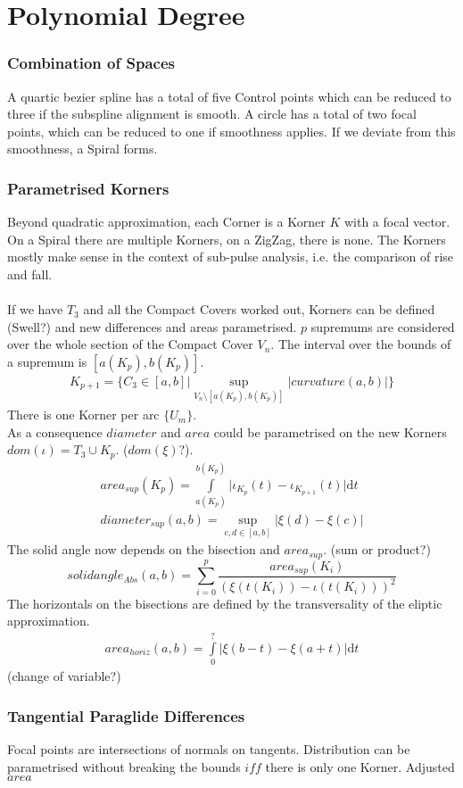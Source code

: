 \documentclass[a4paper,landscape]{report}
\begin{document}
\chapter{Polynomial Degree}
\subsection{Combination of Spaces}
A quartic bezier spline has a total of five Control points which can be reduced to three if the subspline alignment is smooth. A circle has a total of two focal points, which can be reduced to one if smoothness applies. If we deviate from this smoothness, a Spiral forms.
\subsection{Parametrised Korners}
Beyond quadratic approximation, each Corner is a Korner $K$ with a focal vector. On a Spiral there are multiple Korners, on a ZigZag, there is none. The Korners mostly make sense in the context of sub-pulse analysis, i.e. the comparison of rise and fall.\\\\
If we have $T_{3}$ and all the Compact Covers worked out, Korners can be defined (Swell?) and new differences and areas parametrised. $p$ supremums are considered over the whole section of the Compact Cover $V_{n}$. The interval over the bounds of a supremum is $[a(K_{p}),b(K_{p})]$.
\begin{align}
K_{p+1} = \{ C_{3} \in  [a,b]\vert \sup \limits _{V_{n} \setminus [a(K_{p}),b(K_{p})]} \lvert curvature(a,b) \rvert \}
\end{align}
There is one Korner per arc $\{U_{m}\}$.\\
As a consequence $diameter$ and $area$ could be parametrised on the new Korners $dom(\iota)=T_{3}\cup K_{p}$. ($dom(\xi)$?).\\
\begin{align}
area_{sup}(K_{p})=\int \limits _{a(K_{p})}^{b(K_{p})} \lvert \iota_{K_{p}}(t)-\iota_{K_{p+1}}(t) \rvert \mathrm{d}t\\
diameter_{sup}(a,b)=\sup \limits _{c,d \in [a,b]} \lvert \xi(d) - \xi(c) \rvert
\end{align}
The solid angle now depends on the bisection and $area_{sup}$. (sum or product?)
\begin{equation}
solidangle_{Abs}(a,b)=\sum \limits _{i=0}^{p} \frac{area_{sup}(K_{i})}{(\xi(t(K_{i}))-\iota(t(K_{i})))^2}
\end{equation}
The horizontals on the bisections are defined by the transversality of the eliptic approximation.
\begin{align}
area_{horiz}(a,b)=\int \limits _{0}^{?} \lvert \xi(b-t)-\xi(a+t) \rvert \mathrm{d}t
\end{align}
(change of variable?)
\subsection{Tangential Paraglide Differences}
Focal points are intersections of normals on tangents. Distribution can be parametrised without breaking the bounds $iff$ there is only one Korner. Adjusted $area$

\iffalse
\printbibliography
\fi
{}

\end{document}
